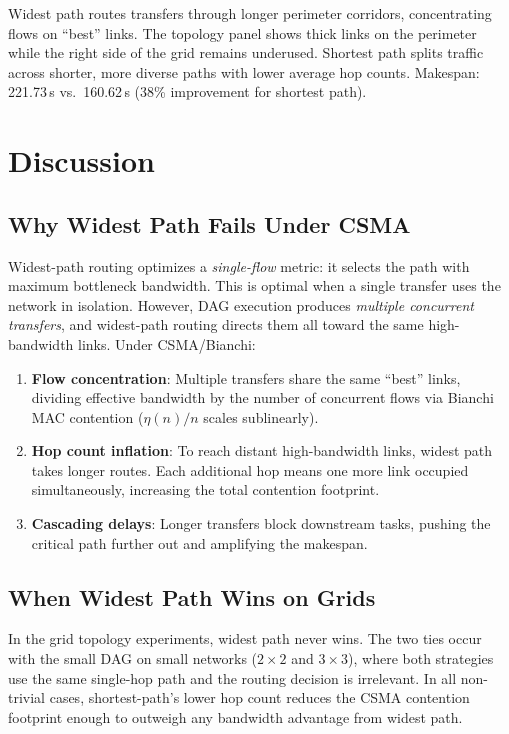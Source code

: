 \documentclass[11pt]{article}
\begin{document}
Widest path routes transfers through longer perimeter corridors, concentrating
flows on ``best'' links. The topology panel shows thick links on the perimeter
while the right side of the grid remains underused. Shortest path splits
traffic across shorter, more diverse paths with lower average hop counts.
Makespan: 221.73\,s vs.\ 160.62\,s (38\% improvement for shortest path).

\section{Discussion}

\subsection{Why Widest Path Fails Under CSMA}

Widest-path routing optimizes a \emph{single-flow} metric: it selects the path
with maximum bottleneck bandwidth. This is optimal when a single transfer uses
the network in isolation. However, DAG execution produces \emph{multiple
concurrent transfers}, and widest-path routing directs them all toward the
same high-bandwidth links. Under CSMA/Bianchi:

\begin{enumerate}
    \item \textbf{Flow concentration}: Multiple transfers share the same
    ``best'' links, dividing effective bandwidth by the number of concurrent
    flows via Bianchi MAC contention ($\eta(n)/n$ scales sublinearly).
    \item \textbf{Hop count inflation}: To reach distant high-bandwidth links,
    widest path takes longer routes. Each additional hop means one more link
    occupied simultaneously, increasing the total contention footprint.
    \item \textbf{Cascading delays}: Longer transfers block downstream tasks,
    pushing the critical path further out and amplifying the makespan.
\end{enumerate}

\subsection{When Widest Path Wins on Grids}

In the grid topology experiments, widest path never wins. The two ties occur
with the small DAG on small networks ($2\times2$ and $3\times3$), where both
strategies use the same single-hop path and the routing decision is irrelevant.
In all non-trivial cases, shortest-path's lower hop count reduces the CSMA
contention footprint enough to outweigh any bandwidth advantage from widest
path.
\end{document}
